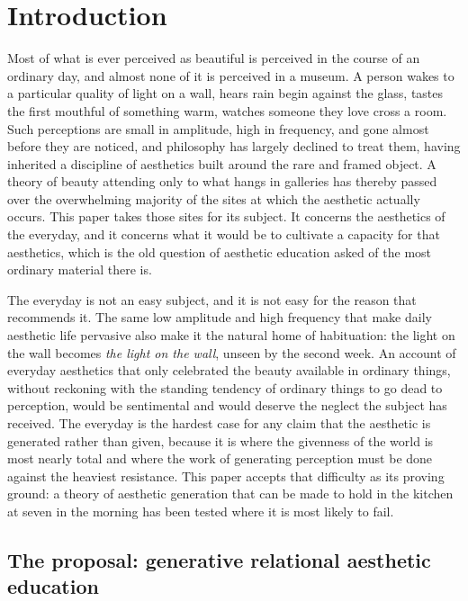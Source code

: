 \section{Introduction}
\label{p23:sec:intro}

\noindent
Most of what is ever perceived as beautiful is perceived in the course of an ordinary day, and almost none of it is perceived in a museum. A person wakes to a particular quality of light on a wall, hears rain begin against the glass, tastes the first mouthful of something warm, watches someone they love cross a room. Such perceptions are small in amplitude, high in frequency, and gone almost before they are noticed, and philosophy has largely declined to treat them, having inherited a discipline of aesthetics built around the rare and framed object. A theory of beauty attending only to what hangs in galleries has thereby passed over the overwhelming majority of the sites at which the aesthetic actually occurs. This paper takes those sites for its subject. It concerns the aesthetics of the everyday, and it concerns what it would be to cultivate a capacity for that aesthetics, which is the old question of aesthetic education asked of the most ordinary material there is.

The everyday is not an easy subject, and it is not easy for the reason that recommends it. The same low amplitude and high frequency that make daily aesthetic life pervasive also make it the natural home of habituation: the light on the wall becomes \emph{the light on the wall}, unseen by the second week. An account of everyday aesthetics that only celebrated the beauty available in ordinary things, without reckoning with the standing tendency of ordinary things to go dead to perception, would be sentimental and would deserve the neglect the subject has received. The everyday is the hardest case for any claim that the aesthetic is generated rather than given, because it is where the givenness of the world is most nearly total and where the work of generating perception must be done against the heaviest resistance. This paper accepts that difficulty as its proving ground: a theory of aesthetic generation that can be made to hold in the kitchen at seven in the morning has been tested where it is most likely to fail.

\subsection*{The proposal: generative relational aesthetic education}

